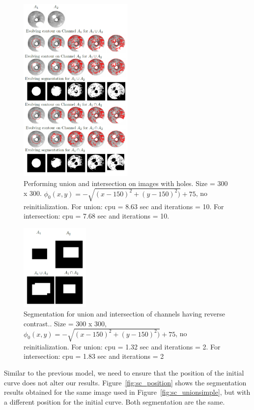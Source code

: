 \documentclass[10pt,twocolumn,letterpaper]{article}
\begin{document}
\begin{figure}[t!]
\centering
\includegraphics[width=0.5\textwidth]{donutlogic.png}
\caption{Performing union and intersection on images with holes. Size = 300 x 300. $\phi_{0}(x,y) = - \sqrt{(x - 150)^2 + (y - 150)^2)} +
75$, no reinitialization. For union: cpu = 8.63 sec and iterations = 10. For intersection: cpu = 7.68 sec and iterations = 10.}
\label{fig:donutlogic}
\end{figure}

\begin{figure}[h!]
\centering
\includegraphics[width=0.3\textwidth]{diffint.png}
\caption{Segmentation for union and intersection of channels having reverse contrast.. Size = 300 x 300, $\phi_{0}(x,y) = - \sqrt{(x - 150)^2 + (y - 150)^2)} +
75$,  no reinitialization. For union: cpu = 1.32 sec and iterations = 2. For intersection: cpu = 1.83 sec and iterations = 2}
\label{fig:diffint}
\end{figure}

Similar to the previous model, we need to ensure that the position of the initial curve does not alter our results. Figure~\ref{fig:sc_position} shows
the segmentation results obtained for the same image used in Figure~\ref{fig:sc_unionsimple}, but with a different position for the initial curve. Both
segmentation are the same.
\end{document}

